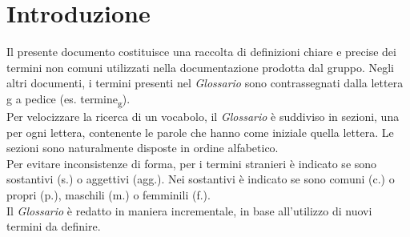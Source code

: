 \section*{Introduzione}
    Il presente documento costituisce una raccolta di definizioni chiare e precise dei termini non
    comuni utilizzati nella documentazione prodotta dal gruppo. Negli altri documenti, i termini
    presenti nel \textit{Glossario} sono contrassegnati dalla lettera g a pedice (es. termine\textsubscript{g}).\\
    Per velocizzare la ricerca di un vocabolo, il \textit{Glossario} è suddiviso in sezioni,
    una per ogni lettera, contenente le parole che hanno come iniziale quella lettera. Le sezioni sono 
    naturalmente disposte in ordine alfabetico.\\
    Per evitare inconsistenze di forma, per i termini stranieri è indicato se sono sostantivi (s.) o aggettivi (agg.).
    Nei sostantivi è indicato se sono comuni (c.) o propri (p.), maschili (m.) o femminili (f.).\\
    Il \textit{Glossario} è redatto in maniera incrementale, in base all'utilizzo
    di nuovi termini da definire.
